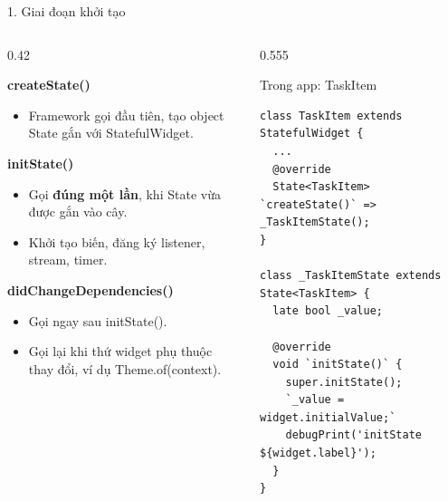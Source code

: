 \documentclass[aspectratio=169,11pt]{beamer}
\newcommand{\ma}[1]{{\ttfamily\small #1}}
\newcommand{\ham}[1]{\par{\color{chinh}\bfseries\ttfamily\small #1}\par\vspace{0.3mm}}
\newcommand{\nhanma}[1]{{\scriptsize\color{xam}#1\par}\vspace{0.8mm}}
\begin{document}
\begin{frame}[fragile]{1. Giai đoạn khởi tạo}
  \begin{columns}[T,onlytextwidth]
    \begin{column}{0.42\textwidth}
      \small
      \ham{createState()}
      \begin{itemize}\setlength{\itemsep}{0.3mm}
        \item Framework gọi đầu tiên, tạo object State gắn với \ma{StatefulWidget}.
      \end{itemize}
      \ham{initState()}
      \begin{itemize}\setlength{\itemsep}{0.3mm}
        \item Gọi \textbf{đúng một lần}, khi State vừa được gắn vào cây.
        \item Khởi tạo biến, đăng ký listener, stream, timer.
      \end{itemize}
      \ham{didChangeDependencies()}
      \begin{itemize}\setlength{\itemsep}{0.3mm}
        \item Gọi ngay sau \ma{initState()}.
        \item Gọi lại khi thứ widget phụ thuộc thay đổi, ví dụ \ma{Theme.of(context)}.
      \end{itemize}
    \end{column}
    \begin{column}{0.555\textwidth}
      \nhanma{Trong app: \ma{\scriptsize TaskItem}}
\begin{lstlisting}
class TaskItem extends StatefulWidget {
  ...
  @override
  State<TaskItem> `createState()` => _TaskItemState();
}

class _TaskItemState extends State<TaskItem> {
  late bool _value;

  @override
  void `initState()` {
    super.initState();
    `_value = widget.initialValue;`
    debugPrint('initState ${widget.label}');
  }
}
\end{lstlisting}
    \end{column}
  \end{columns}
\end{frame}
\end{document}
